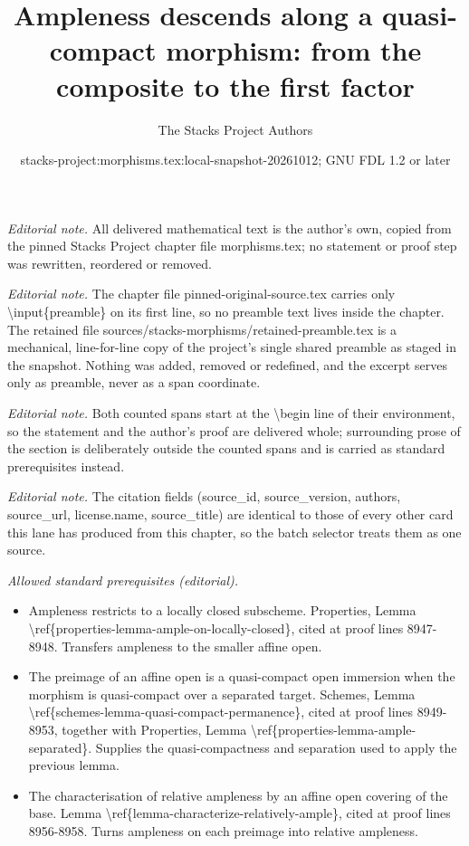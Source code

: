 \documentclass[10pt,a4paper]{amsart}
\title{Ampleness descends along a quasi-compact morphism: from the composite to the first factor}
\author{The Stacks Project Authors}
\date{stacks-project:morphisms.tex:local-snapshot-20261012; GNU FDL 1.2 or later}
\theoremstyle{plain}
\theoremstyle{definition}
\theoremstyle{remark}
\numberwithin{equation}{subsection}
\begin{document}
\maketitle
\setcounter{subsection}{1}
\noindent\textit{Editorial note.} All delivered mathematical text is the author's own, copied from the pinned Stacks Project chapter file morphisms.tex; no statement or proof step was rewritten, reordered or removed.\par\medskip
\noindent\textit{Editorial note.} The chapter file pinned-original-source.tex carries only \textbackslash{}input\{preamble\} on its first line, so no preamble text lives inside the chapter. The retained file sources/stacks-morphisms/retained-preamble.tex is a mechanical, line-for-line copy of the project's single shared preamble as staged in the snapshot. Nothing was added, removed or redefined, and the excerpt serves only as preamble, never as a span coordinate.\par\medskip
\noindent\textit{Editorial note.} Both counted spans start at the \textbackslash{}begin line of their environment, so the statement and the author's proof are delivered whole; surrounding prose of the section is deliberately outside the counted spans and is carried as standard prerequisites instead.\par\medskip
\noindent\textit{Editorial note.} The citation fields (source\_id, source\_version, authors, source\_url, license.name, source\_title) are identical to those of every other card this lane has produced from this chapter, so the batch selector treats them as one source.\par\medskip
\noindent\textit{Allowed standard prerequisites (editorial).}\begin{itemize}
\item Ampleness restricts to a locally closed subscheme. Properties, Lemma \textbackslash{}ref\{properties-lemma-ample-on-locally-closed\}, cited at proof lines 8947-8948. Transfers ampleness to the smaller affine open.
\item The preimage of an affine open is a quasi-compact open immersion when the morphism is quasi-compact over a separated target. Schemes, Lemma \textbackslash{}ref\{schemes-lemma-quasi-compact-permanence\}, cited at proof lines 8949-8953, together with Properties, Lemma \textbackslash{}ref\{properties-lemma-ample-separated\}. Supplies the quasi-compactness and separation used to apply the previous lemma.
\item The characterisation of relative ampleness by an affine open covering of the base. Lemma \textbackslash{}ref\{lemma-characterize-relatively-ample\}, cited at proof lines 8956-8958. Turns ampleness on each preimage into relative ampleness.
\end{itemize}\medskip
\end{document}
